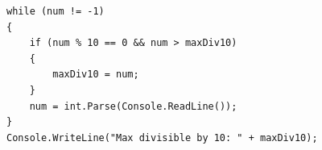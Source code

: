 \documentclass[14pt]{extarticle}
\begin{document}
\begin{enumerate}[itemsep=2em]
\begin{boxSolution}
\begin{english}
\begin{verbatim}
while (num != -1)
{
    if (num % 10 == 0 && num > maxDiv10)
    {
        maxDiv10 = num;
    }
    num = int.Parse(Console.ReadLine());
}
Console.WriteLine("Max divisible by 10: " + maxDiv10);
\end{verbatim}
\end{english}
\end{boxSolution}
\fi
\filbreak




\end{enumerate}
\end{document}
